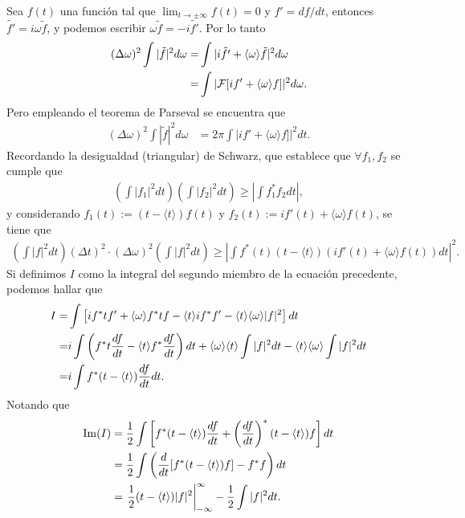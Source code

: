 Sea $f(t)$ una función tal que $\lim_{t \rightarrow \pm \infty} f(t)=0$ y $f'=df/dt$, entonces $\tilde{f'}=i \omega \tilde{f}$, y podemos escribir $\omega \tilde{f}=-i \tilde{f'}$. Por lo tanto
\begin{align}
(\Delta \omega)^2 \int |\tilde{f}|^2 d\omega =&\int |i\tilde{f'}+\langle \omega \rangle \tilde{f}|^2 d \omega \notag \\
=&\int |{\cal F}[if'+\langle \omega \rangle f]|^2 d\omega.
\end{align}
Pero empleando el teorema de Parseval se encuentra que
\begin{align}
(\Delta \omega)^2 \int |\tilde{f}|^2 d\omega &= 2\pi\int |if'+\langle \omega \rangle f]|^2 dt.
\end{align}
Recordando la desigualdad (triangular) de Schwarz, que establece que $\forall f_{1},f_{2}$ se cumple que
\begin{align}
\left( \int |f_{1}|^2 dt \right)\left( \int |f_{2}|^2 dt\right) \geq \left|\int f_{1}^{*}f_{2}dt\right|,
\end{align}
y considerando $f_{1}(t):=(t-\langle t \rangle)f(t)$ y $f_{2}(t):=if'(t)+\langle \omega \rangle f(t)$, se tiene que
\begin{align}
\left(\int |f|^2 dt \right) (\Delta t)^2 \cdot (\Delta \omega)^2 \left(\int |f|^2 dt \right)\geq
\left|\int f^{*}(t)(t-\langle t \rangle)\left(if'(t)+ \langle\omega\rangle f(t)\right) dt\right|^2.
\end{align}
Si definimos $I$ como la integral del segundo miembro de la ecuación precedente, podemos hallar que
\begin{align}
I=&\int \left[ i f^{*}t f'+\langle \omega \rangle f^{*} t f-\langle t \rangle i f^{*}f'-\langle t \rangle \langle \omega \rangle |f|^2\right]dt  \notag \\
=&i\int \left(f^{*} t \frac{df}{dt}-\langle t \rangle f^{*} \frac{df}{dt} \right) dt+\langle \omega \rangle \langle t \rangle \int |f|^2 dt-\langle t \rangle \langle \omega \rangle \int |f|^2 dt\notag \\
=&i \int f^{*}(t-\langle t\rangle)\frac{df}{dt} dt.
\end{align}
Notando que
\begin{align}
{\rm Im}(I) &= \frac{1}{2}\int \left[ f^{*}(t-\langle t \rangle)\frac{df}{dt}+\left(\frac{df}{dt}\right)^{*}(t-\langle t \rangle)f\right]dt\notag \\
&= \frac{1}{2}\int \left( \frac{d}{dt}[f^{*}(t-\langle t \rangle)f]-f^{*}f\right)dt\notag \\
&= \left. \frac{1}{2} (t-\langle t \rangle)|f|^2 \right|_{-\infty}^{\infty}-\frac{1}{2}\int |f|^2 dt.
\end{align}
